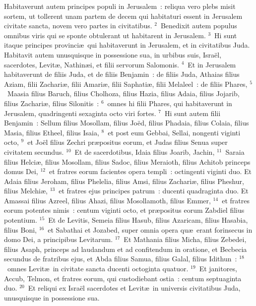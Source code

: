 \lettrine[lines=10,image=true,loversize=0.05,lraise=-0.03]{H}{}abitaverunt autem principes populi in Jerusalem~: reliqua vero plebs misit sortem, ut tollerent unam partem de decem qui habitaturi essent in Jerusalem civitate sancta, novem vero partes in civitatibus.
${}^{2}$~Benedixit autem populus omnibus viris qui se sponte obtulerant ut habitarent in Jerusalem.
${}^{3}$~Hi sunt itaque principes provinci\ae\ qui habitaverunt in Jerusalem, et in civitatibus Juda. Habitavit autem unusquisque in possessione sua, in urbibus suis, Isra\"el, sacerdotes, Levit\ae , Nathin\ae i, et filii servorum Salomonis.
${}^{4}$~Et in Jerusalem habitaverunt de filiis Juda, et de filiis Benjamin~: de filiis Juda, Athaias filius Aziam, filii Zachari\ae , filii Amari\ae , filii Saphati\ae , filii Melaleel~: de filiis Phares,
${}^{5}$~Maasia filius Baruch, filius Cholhoza, filius Hazia, filius Adaia, filius Jojarib, filius Zachari\ae , filius Silonitis~:
${}^{6}$~omnes hi filii Phares, qui habitaverunt in Jerusalem, quadringenti sexaginta octo viri fortes.
${}^{7}$~Hi sunt autem filii Benjamin~: Sellum filius Mosollam, filius Jo\"ed, filius Phadaia, filius Colaia, filius Masia, filius Etheel, filius Isaia,
${}^{8}$~et post eum Gebbai, Sellai, nongenti viginti octo,
${}^{9}$~et Jo\"el filius Zechri pr\ae positus eorum, et Judas filius Senua super civitatem secundus.
${}^{10}$~Et de sacerdotibus, Idaia filius Joarib, Jachin,
${}^{11}$~Saraia filius Helci\ae , filius Mosollam, filius Sadoc, filius Meraioth, filius Achitob princeps domus Dei,
${}^{12}$~et fratres eorum facientes opera templi~: octingenti viginti duo. Et Adaia filius Jeroham, filius Phelelia, filius Amsi, filius Zachari\ae , filius Pheshur, filius Melchi\ae ,
${}^{13}$~et fratres ejus principes patrum~: ducenti quadraginta duo. Et Amassai filius Azreel, filius Ahazi, filius Mosollamoth, filius Emmer,
${}^{14}$~et fratres eorum potentes nimis~: centum viginti octo, et pr\ae positus eorum Zabdiel filius potentium.
${}^{15}$~Et de Levitis, Semeia filius Hasub, filius Azaricam, filius Hasabia, filius Boni,
${}^{16}$~et Sabathai et Jozabed, super omnia opera qu\ae\ erant forinsecus in domo Dei, a principibus Levitarum.
${}^{17}$~Et Mathania filius Micha, filius Zebedei, filius Asaph, princeps ad laudandum et ad confitendum in oratione, et Becbecia secundus de fratribus ejus, et Abda filius Samua, filius Galal, filius Idithun~:
${}^{18}$~omnes Levit\ae\ in civitate sancta ducenti octoginta quatuor.
${}^{19}$~Et janitores, Accub, Telmon, et fratres eorum, qui custodiebant ostia~: centum septuaginta duo.
${}^{20}$~Et reliqui ex Isra\"el sacerdotes et Levit\ae\ in universis civitatibus Juda, unusquisque in possessione sua.
